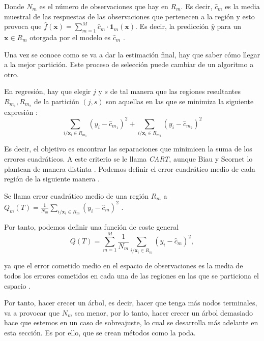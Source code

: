 \noindent Donde $N_m$ es el número de observaciones que hay en $R_m$. Es decir, $\hat{c}_m$ es la media muestral de las respuestas de las observaciones que pertenecen a la región y esto provoca que $\hat{f}(\mathbf{x})=\sum_{m=1}^M \hat{c}_m \cdot \mathbf{1}_m(\mathbf{x})$. Es decir, la predicción $\hat{y}$ para un $\mathbf{x}\in R_m$ otorgada por el modelo es $\hat{c}_m$ \cite{Hastie 2001, Breiman 1984}.

\noindent Una vez se conoce como se va a dar la estimación final, hay que saber cómo llegar a la mejor partición. Este proceso de selección puede cambiar de un algoritmo a otro.  

\noindent En regresión, hay que elegir $j$ y $s$ de tal manera que las regiones resultantes $R_{m_1},R_{m_2}$ de la partición $(j,s)$ son aquellas en las que se minimiza la siguiente expresión \cite{Breiman 1984}:
\begin{equation}
\sum_{i/\mathbf{x}_i\in R_{m_1} } (y_i-\hat{c}_{m_1})^2+\sum_{i/\mathbf{x}_i\in R_{m_2} } (y_i-\hat{c}_{m_2})^2
\end{equation}

\noindent Es decir, el objetivo es encontrar las separaciones que minimicen la suma de los errores cuadráticos. A este criterio se le llama \emph{CART}, aunque Biau y Scornet  lo plantean de manera distinta \cite{Biau 2016, Breiman 1984}. Podemos definir el error cuadrático medio de cada región de la siguiente manera \cite{Hastie 2001}.

\begin{defi}
Se llama error cuadrático medio de una región $R_m$ a $Q_m(T)=\frac{1}{N_m}\sum_{i/\mathbf{x}_i\in R_m}(y_i-\hat{c}_m)^2$ .
\end{defi}

\noindent Por tanto, podemos definir una función de coste general 
\begin{equation}
Q(T)=\sum_{m=1}^M\frac{1}{N_m}\sum_{i/\mathbf{x}_i\in R_m} (y_i-\hat{c}_m)^2,
\end{equation}


\noindent ya que el error cometido medio en el espacio de observaciones es la media de todos los errores cometidos en cada una de las regiones en las que se particiona el espacio \cite{Breiman 1984}. 

\noindent Por tanto, hacer crecer un árbol, es decir, hacer que tenga más nodos terminales, va a provocar que $N_m$ sea menor, por lo tanto, hacer crecer un árbol demasiado hace que estemos en un caso de sobreajuste, lo cual se desarrolla más adelante en esta sección. Es por ello, que se crean métodos como la poda.

